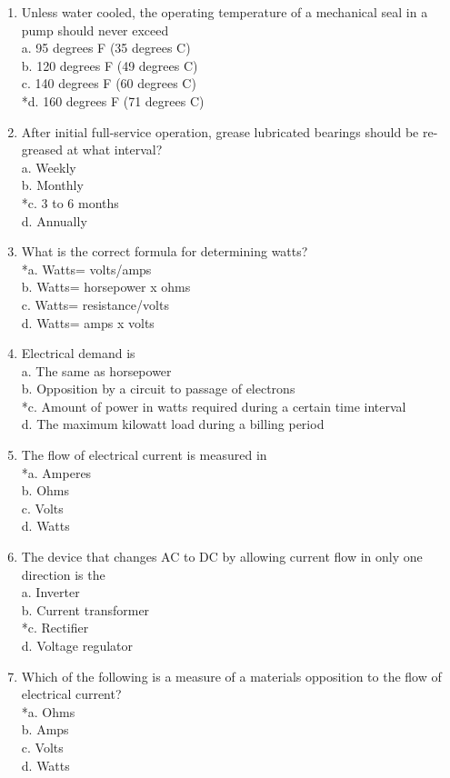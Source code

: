 \begin{enumerate}[1.]
\item Unless water cooled, the operating temperature of a mechanical seal in a pump should never exceed\\
a. 95 degrees F (35 degrees C)\\
b. 120 degrees F (49 degrees C)\\
c. 140 degrees F (60 degrees C)\\
*d. 160 degrees F (71 degrees C)\\
\item After initial full-service operation, grease lubricated bearings should be re-greased at what interval?\\
a. Weekly\\
b. Monthly\\
*c. 3 to 6 months\\
d. Annually\\
\item What is the correct formula for determining watts?\\
*a. Watts= volts/amps\\
b. Watts= horsepower x ohms\\
c. Watts= resistance/volts\\
d. Watts= amps x volts\\
\item Electrical demand is\\
a. The same as horsepower\\
b. Opposition by a circuit to passage of electrons\\
*c. Amount of power in watts required during a certain time interval\\
d. The maximum kilowatt load during a billing period\\
\item The flow of electrical current is measured in\\
*a. Amperes\\
b. Ohms\\
c. Volts\\
d. Watts\\
\item The device that changes AC to DC by allowing current flow in only one direction is the\\
a. Inverter\\
b. Current transformer\\
*c. Rectifier\\
d. Voltage regulator\\
\item Which of the following is a measure of a materials opposition to the flow of electrical current?\\
*a. Ohms\\
b. Amps\\
c. Volts\\
d. Watts\\
\end{enumerate}
